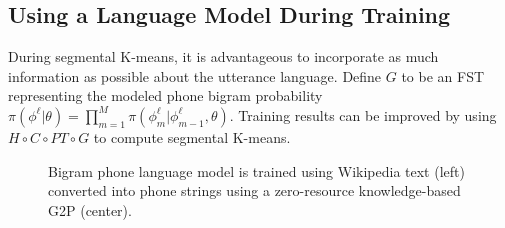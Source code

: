 \subsection{Using a Language Model During Training}
\label{sec:trainwithlm}

During segmental K-means, it is advantageous to incorporate as much
information as possible about the utterance language.
Define $G$ to be an FST representing the modeled phone bigram
probability
$\pi(\phi^\ell|\theta)=\prod_{m=1}^M\pi(\phi_m^\ell|\phi_{m-1}^\ell,\theta)$.
Training results can be improved by using $H\circ C\circ PT\circ G$ to
compute segmental K-means.

\begin{figure}
  \begin{center}
  \end{center}
  \vspace*{-3mm}
  \caption{Bigram phone language model is trained using Wikipedia text
    (left) converted into phone strings using a zero-resource
    knowledge-based G2P (center).}
  \label{fig:wikitext}
\end{figure}

